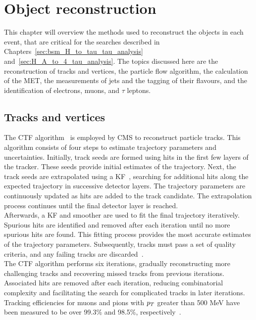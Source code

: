 \chapter{Object reconstruction}
\label{sec:object_reconstruction}

This chapter will overview the methods used to reconstruct the objects in each event, that are critical for the searches described in Chapters~\ref{sec:bsm_H_to_tau_tau_analysis} and~\ref{sec:H_A_to_4_tau_analysis}.
The topics discussed here are the reconstruction of tracks and vertices, the particle flow algorithm, the calculation of the \ac{MET}, the measurements of jets and the tagging of their flavours, and the identification of electrons, muons, and $\tau$ leptons.

\section{Tracks and vertices}

The \ac{CTF} algorithm~\cite{CMS:2014pgm} is employed by \ac{CMS} to reconstruct particle tracks. 
This algorithm consists of four steps to estimate trajectory parameters and uncertainties. 
Initially, track seeds are formed using hits in the first few layers of the tracker. 
These seeds provide initial estimates of the trajectory. 
Next, the track seeds are extrapolated using a \ac{KF}~\cite{Fruhwirth:1987fm}, searching for additional hits along the expected trajectory in successive detector layers. 
The trajectory parameters are continuously updated as hits are added to the track candidate. 
The extrapolation process continues until the final detector layer is reached. \\

Afterwards, a \ac{KF} and smoother are used to fit the final trajectory iteratively. 
Spurious hits are identified and removed after each iteration until no more spurious hits are found. 
This fitting process provides the most accurate estimates of the trajectory parameters. 
Subsequently, tracks must pass a set of quality criteria, and any failing tracks are discarded~\cite{Fruhwirth:1987fm}. \\

The \ac{CTF} algorithm performs six iterations, gradually reconstructing more challenging tracks and recovering missed tracks from previous iterations. 
Associated hits are removed after each iteration, reducing combinatorial complexity and facilitating the search for complicated tracks in later iterations. 
Tracking efficiencies for muons and pions with $p_{T}$ greater than 500 MeV have been measured to be over 99.3\% and 98.5\%, respectively~\cite{CMS:2010mua}. \\

